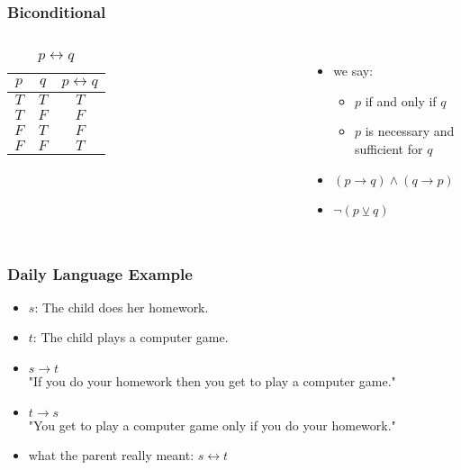 \documentclass[dvipsnames]{beamer}
\begin{document}
\begin{frame}
  \frametitle{Biconditional}

  \begin{columns}
    \begin{table}
      \caption{$p \leftrightarrow q$}
      \begin{tabular}{|c|c||c|}\hline
        $p$ & $q$ & $p \leftrightarrow q$\\\hline\hline
        $T$ & $T$ & $T$                  \\\hline
        $T$ & $F$ & $F$                  \\\hline
        $F$ & $T$ & $F$                  \\\hline
        $F$ & $F$ & $T$                  \\\hline
      \end{tabular}
    \end{table}

    \pause
    \begin{itemize}
      \item we say:
      \begin{itemize}
        \item $p$ if and only if $q$
        \item $p$ is necessary and sufficient for $q$
      \end{itemize}

      \pause
      \item $(p \rightarrow q) \wedge (q \rightarrow p)$
      \item $\neg (p \veebar q)$
    \end{itemize}
  \end{columns}
\end{frame}

\begin{frame}
  \frametitle{Daily Language Example}

  \begin{example}
    \begin{itemize}
      \item $s$: The child does her homework.
      \item $t$: The child plays a computer game.

      \pause
      \medskip
      \item $s \rightarrow t$\\
        "If you do your homework then you get to play a computer game."
      \item $t \rightarrow s$\\
        "You get to play a computer game only if you do your homework."

      \pause
      \medskip
      \item what the parent really meant: $s \leftrightarrow t$
    \end{itemize}
  \end{example}
\end{frame}
\end{document}
